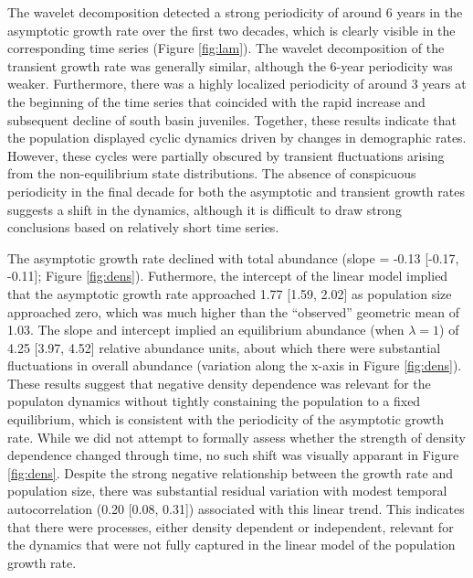 \documentclass[11pt]{article}
\begin{document}
{The wavelet decomposition detected a strong periodicity of around 6 years
in the asymptotic growth rate over the first two decades, 
which is clearly visible in the corresponding time series (Figure \ref{fig:lam}).
The wavelet decomposition of the transient growth rate was generally similar,
although the 6-year periodicity was weaker.
Furthermore, there was a highly localized periodicity of around 3 years 
at the beginning of the time series 
that coincided with the rapid increase and subsequent decline of south basin juveniles.
Together, these results indicate that the population displayed cyclic dynamics 
driven by changes in demographic rates.
However, these cycles were partially obscured by transient fluctuations arising 
from the non-equilibrium state distributions.
The absence of conspicuous periodicity in the final decade
for both the asymptotic and transient growth rates 
suggests a shift in the dynamics, 
although it is difficult to draw strong conclusions 
based on relatively short time series.

The asymptotic growth rate declined with total abundance
(slope = -0.13 [-0.17, -0.11]; Figure \ref{fig:dens}).
Futhermore, 
the intercept of the linear model implied that 
the asymptotic growth rate approached 1.77 [1.59, 2.02] 
as population size approached zero,
which was much higher than the ``observed'' geometric mean of 1.03.
The slope and intercept implied an equilibrium abundance (when $\lambda=1$)
of 4.25 [3.97, 4.52] relative abundance units,
about which there were substantial fluctuations in overall abundance 
(variation along the x-axis in Figure \ref{fig:dens}).
These results suggest that negative density dependence was relevant for the populaton
dynamics without tightly constaining the population to a fixed equilibrium,
which is consistent with the periodicity of the asymptotic growth rate.
While we did not attempt to formally assess whether the strength of density dependence
changed through time,
no such shift was visually apparant in Figure \ref{fig:dens}.
Despite the strong negative relationship between the growth rate and population size, 
there was substantial residual variation with modest
temporal autocorrelation (0.20 [0.08, 0.31]) associated with this linear trend.
This indicates that there were processes, either density dependent or independent,
relevant for the dynamics 
that were not fully captured in the linear model of the population growth rate.

}
\end{document}
